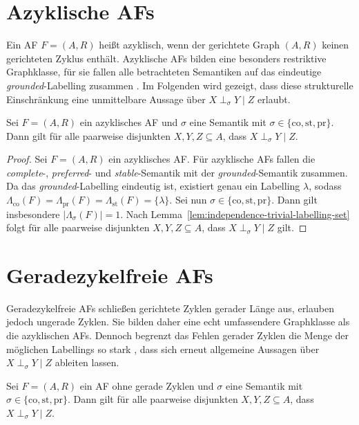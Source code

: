 \section{Azyklische AFs}
\label{sec:acyc-afs}
Ein AF \(F=(A,R)\) heißt azyklisch, wenn der gerichtete Graph \((A,R)\) keinen gerichteten Zyklus enthält. 
Azyklische AFs bilden eine besonders restriktive Graphklasse, für sie fallen alle betrachteten 
Semantiken auf das eindeutige \emph{grounded}-Labelling zusammen \cite{dung:1995:af,caminada:2009:logical-account}.
Im Folgenden wird gezeigt, dass diese strukturelle Einschränkung 
eine unmittelbare Aussage über \(X\perp_\sigma Y\mid Z\) erlaubt.
\begin{Proposition}
\label{prop:acyc-af-ci-st-top}
    Sei \(F=(A,R)\) ein azyklisches AF und \(\sigma\) eine Semantik mit
    \(\sigma \in \{\mathrm{co},\mathrm{st},\mathrm{pr}\}\). Dann gilt für alle paarweise disjunkten
    \(X,Y,Z \subseteq A\), dass \(X\perp_\sigma Y\mid Z\).
\end{Proposition}

\begin{proof}
\label{pr:acyc-af-ci-st-top-true}
    Sei \(F=(A,R)\) ein azyklisches AF. Für azyklische AFs fallen die \emph{complete}-, 
    \emph{preferred}- und \emph{stable}-Semantik mit der \emph{grounded}-Semantik zusammen. 
    Da das \emph{grounded}-Labelling eindeutig ist, existiert genau ein Labelling \(\lambda\),
     sodass \(\Lambda_{\mathrm{co}}(F)=\Lambda_{\mathrm{pr}}(F)=\Lambda_{\mathrm{st}}(F)=\{\lambda\}\).
    Sei nun \(\sigma \in \{\mathrm{co},\mathrm{st},\mathrm{pr}\}\). Dann gilt insbesondere \(|\Lambda_{\sigma}(F)|=1\).
     Nach Lemma~\ref{lem:independence-trivial-labelling-set} folgt für alle 
     paarweise disjunkten \(X,Y,Z \subseteq A\), dass \(X \perp_\sigma Y \mid Z\) gilt.
\end{proof}
\section{Geradezykelfreie AFs}
\label{sec:even-cycle-free-afs}
Geradezykelfreie AFs schließen gerichtete Zyklen gerader Länge aus, erlauben jedoch ungerade Zyklen. 
Sie bilden daher eine echt umfassendere Graphklasse als die azyklischen AFs. 
Dennoch begrenzt das Fehlen gerader Zyklen die Menge der möglichen Labellings so stark \cite{dvorak:2012:computational-aspects}, 
dass sich erneut allgemeine Aussagen über \(X\perp_\sigma Y\mid Z\) ableiten lassen.
\begin{Proposition}
\label{prop:even-cycle-free-af-ci-st-top}
    Sei \(F=(A,R)\) ein AF ohne gerade Zyklen und \(\sigma\) eine Semantik mit
    \(\sigma \in \{\mathrm{co},\mathrm{st},\mathrm{pr}\}\). Dann gilt für alle paarweise disjunkten
    \(X,Y,Z \subseteq A\), dass \(X\perp_\sigma Y\mid Z\).
\end{Proposition}

